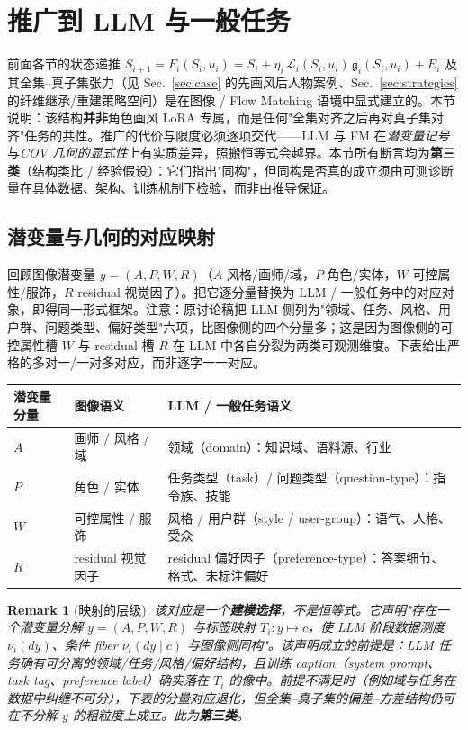 \documentclass[11pt,a4paper]{article}
\newtheorem{remark}[theorem]{Remark}
\newcommand{\cL}{\mathcal{L}}   %
\newcommand{\gres}{\bm{\mathfrak{g}}} %
\begin{document}
\section{推广到 LLM 与一般任务}\label{sec:llm}

前面各节的状态递推 $S_{i+1}=F_i(S_i,u_i)=S_i+\eta_i\,\cL_i(S_i,u_i)\,\gres_i(S_i,u_i)+E_i$ 及其全集--真子集张力（见 Sec.~\ref{sec:case} 的先画风后人物案例、Sec.~\ref{sec:strategies} 的纤维继承/重建策略空间）是在图像 / Flow Matching 语境中显式建立的。本节说明：该结构\textbf{并非}角色画风 LoRA 专属，而是任何"全集对齐之后再对真子集对齐"任务的共性。推广的代价与限度必须逐项交代——LLM 与 FM 在\emph{潜变量记号}与\emph{COV 几何的显式性}上有实质差异，照搬恒等式会越界。本节所有断言均为\textbf{第三类}（结构类比 / 经验假设）：它们指出"同构"，但同构是否真的成立须由可测诊断量在具体数据、架构、训练机制下检验，而非由推导保证。

\subsection{潜变量与几何的对应映射}

回顾图像潜变量 $y=(A,P,W,R)$（$A$ 风格/画师/域，$P$ 角色/实体，$W$ 可控属性/服饰，$R$ residual 视觉因子）。把它逐分量替换为 LLM / 一般任务中的对应对象，即得同一形式框架。注意：原讨论稿把 LLM 侧列为"领域、任务、风格、用户群、问题类型、偏好类型"六项，比图像侧的四个分量多；这是因为图像侧的可控属性槽 $W$ 与 residual 槽 $R$ 在 LLM 中各自分裂为两类可观测维度。下表给出严格的多对一/一对多对应，而非逐字一一对应。

\begin{center}
\begin{tabular}{@{}lll@{}}
\toprule
潜变量分量 & 图像语义 & LLM / 一般任务语义 \\
\midrule
$A$ & 画师 / 风格 / 域 & 领域（domain）：知识域、语料源、行业 \\
$P$ & 角色 / 实体 & 任务类型（task）/ 问题类型（question-type）：指令族、技能 \\
$W$ & 可控属性 / 服饰 & 风格 / 用户群（style / user-group）：语气、人格、受众 \\
$R$ & residual 视觉因子 & residual 偏好因子（preference-type）：答案细节、格式、未标注偏好 \\
\bottomrule
\end{tabular}
\end{center}

\begin{remark}[映射的层级]\label{rem:s11:map-tier}
该对应是一个\textbf{建模选择}，不是恒等式。它声明"存在一个潜变量分解 $y=(A,P,W,R)$ 与标签映射 $T_i:y\mapsto c$，使 LLM 阶段数据测度 $\nu_i(dy)$、条件 fiber $\nu_i(dy\mid c)$ 与图像侧同构"。该声明成立的前提是：LLM 任务确有可分离的领域/任务/风格/偏好结构，且训练 caption（system prompt、task tag、preference label）确实落在 $T_i$ 的像中。前提不满足时（例如域与任务在数据中纠缠不可分），下表的分量对应退化，但全集--真子集的偏差--方差结构仍可在不分解 $y$ 的粗粒度上成立。此为\textbf{第三类}。
\end{remark}
\end{document}
